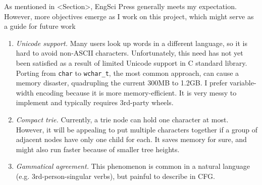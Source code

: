 \documentclass[../main.tex]{subfiles}
\begin{document}
As mentioned in <Section>, EngSci Press generally meets my expectation. However, more objectives emerge as I work on this project, which might serve as a guide for future work

\begin{enumerate}
	\item \textit{Unicode support.}
	Many users look up words in a different language, so it is hard to avoid non-ASCII characters. Unfortunately, this need has not yet been satisfied as a result of limited Unicode support in C standard library. Porting from \texttt{char} to \texttt{wchar\_t}, the most common approach, can cause a memory disaster, quadrupling the current 300MB to 1.2GB. I prefer variable-width encoding because it is more memory-efficient. It is very messy to implement and typically requires 3rd-party wheels.
	
	\item \textit{Compact trie.}
	Currently, a trie node can hold one character at most. However, it will be appealing to put multiple characters together if a group of adjacent nodes have only one child for each. It saves memory for sure, and might also run faster because of smaller tree heights.
	
	\item \textit{Gammatical agreement.}
	This phenomenon is common in a natural language (e.g. 3rd-person-singular verbs), but painful to describe in CFG.
\end{enumerate}
\end{document}
